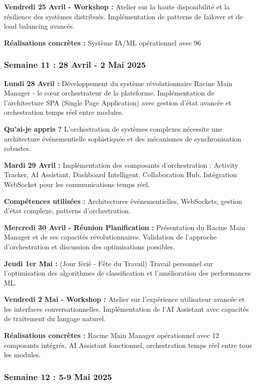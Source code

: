 \documentclass[a4paper,12pt]{article}
\begin{document}
\textbf{Vendredi 25 Avril - Workshop :}
Atelier sur la haute disponibilité et la résilience des systèmes distribués. Implémentation de patterns de failover et de load balancing avancés.

\textbf{Réalisations concrètes :} Système IA/ML opérationnel avec 96%

\subsubsection{Semaine 11 : 28 Avril - 2 Mai 2025}

\textbf{Lundi 28 Avril :}
Développement du système révolutionnaire Racine Main Manager - le cœur orchestrateur de la plateforme. Implémentation de l'architecture SPA (Single Page Application) avec gestion d'état avancée et orchestration temps réel entre modules.

\textbf{Qu'ai-je appris ?} L'orchestration de systèmes complexes nécessite une architecture événementielle sophistiquée et des mécanismes de synchronisation robustes.

\textbf{Mardi 29 Avril :}
Implémentation des composants d'orchestration : Activity Tracker, AI Assistant, Dashboard Intelligent, Collaboration Hub. Intégration WebSocket pour les communications temps réel.

\textbf{Compétences utilisées :} Architectures événementielles, WebSockets, gestion d'état complexe, patterns d'orchestration.

\textbf{Mercredi 30 Avril - Réunion Planification :}
Présentation du Racine Main Manager et de ses capacités révolutionnaires. Validation de l'approche d'orchestration et discussion des optimisations possibles.

\textbf{Jeudi 1er Mai :} (Jour férié - Fête du Travail)
Travail personnel sur l'optimisation des algorithmes de classification et l'amélioration des performances ML.

\textbf{Vendredi 2 Mai - Workshop :}
Atelier sur l'expérience utilisateur avancée et les interfaces conversationnelles. Implémentation de l'AI Assistant avec capacités de traitement du langage naturel.

\textbf{Réalisations concrètes :} Racine Main Manager opérationnel avec 12 composants intégrés, AI Assistant fonctionnel, orchestration temps réel entre tous les modules.

\subsubsection{Semaine 12 : 5-9 Mai 2025}
\end{document}
